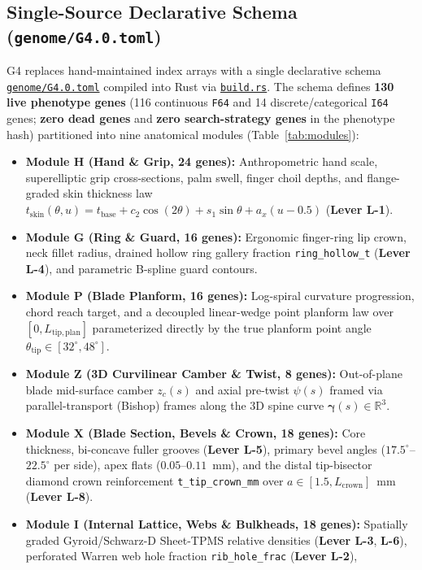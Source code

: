 \documentclass[10pt,journal,letterpaper]{IEEEtran}
\DeclareRobustCommand{\code}[1]{\texorpdfstring{{\nolinkurl{#1}}}{#1}}
\newcommand{\src}[2]{\href{https://github.com/neverhuman/jarambit/blob/v\GFourVersion/#1}{#2}}
\begin{document}
\subsection{Single-Source Declarative Schema (\code{genome/G4.0.toml})}
G4 replaces hand-maintained index arrays with a single declarative schema \src{genome/G4.0.toml}{\code{genome/G4.0.toml}} compiled
into Rust via \src{crates/g4/build.rs}{\code{build.rs}}. The schema defines \textbf{130 live phenotype genes} (116 continuous
\code{F64} and 14 discrete/categorical \code{I64} genes; \textbf{zero dead genes} and \textbf{zero search-strategy genes} in the
phenotype hash) partitioned into nine anatomical modules (Table~\ref{tab:modules}):
\begin{itemize}
\item \textbf{Module H (Hand \& Grip, 24 genes):} Anthropometric hand scale, superelliptic grip cross-sections, palm swell, finger
choil depths, and flange-graded skin thickness law $t_{\mathrm{skin}}(\theta, u) = t_{\mathrm{base}} + c_2 \cos(2\theta) + s_1 \sin\theta + a_x (u - 0.5)$ (\textbf{Lever L-1}).
\item \textbf{Module G (Ring \& Guard, 16 genes):} Ergonomic finger-ring lip crown, neck fillet radius, drained hollow ring
gallery fraction \code{ring\_hollow\_t} (\textbf{Lever L-4}), and parametric B-spline guard contours.
\item \textbf{Module P (Blade Planform, 16 genes):} Log-spiral curvature progression, chord reach target, and a decoupled
linear-wedge point planform law over $[0, L_{\mathrm{tip,plan}}]$ parameterized directly by the true planform point angle
$\theta_{\mathrm{tip}} \in [32^\circ, 48^\circ]$.
\item \textbf{Module Z (3D Curvilinear Camber \& Twist, 8 genes):} Out-of-plane blade mid-surface camber $z_c(s)$ and axial
pre-twist $\psi(s)$ framed via parallel-transport (Bishop) frames along the 3D spine curve $\boldsymbol{\gamma}(s) \in \mathbb{R}^3$.
\item \textbf{Module X (Blade Section, Bevels \& Crown, 18 genes):} Core thickness, bi-concave fuller grooves (\textbf{Lever L-5}),
primary bevel angles ($17.5^\circ$--$22.5^\circ$ per side), apex flats ($0.05$--$0.11$~mm), and the distal tip-bisector diamond
crown reinforcement \code{t\_tip\_crown\_mm} over $a \in [1.5, L_{\mathrm{crown}}]$~mm (\textbf{Lever L-8}).
\item \textbf{Module I (Internal Lattice, Webs \& Bulkheads, 18 genes):} Spatially graded Gyroid/Schwarz-D Sheet-TPMS relative
densities (\textbf{Lever L-3}, \textbf{L-6}), perforated Warren web hole fraction \code{rib\_hole\_frac} (\textbf{Lever L-2}),

\end{itemize}
\end{document}
